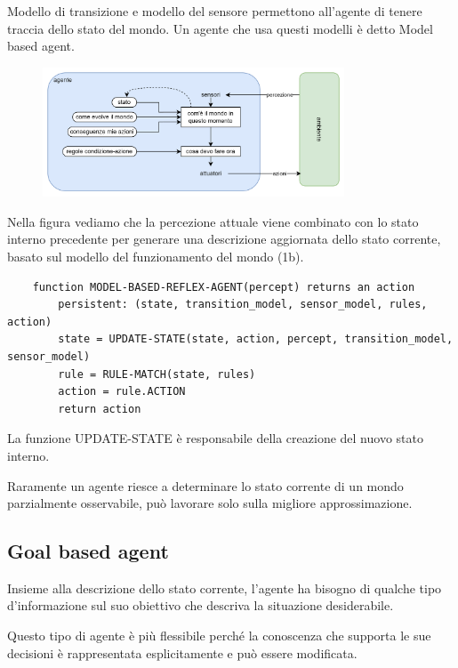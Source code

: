 Modello di transizione e modello del sensore permettono all'agente di tenere traccia dello stato del mondo. Un agente che usa questi modelli è detto \foreignlanguage{english}{Model based agent}.

\begin{figure}[H]
	\centering
	\includegraphics[width=0.8\textwidth]{capitoli/agenti-intelligenti/imgs/model-based.png}
\end{figure}

Nella figura vediamo che la percezione attuale viene combinato con lo stato interno precedente per generare una descrizione aggiornata dello stato corrente, basato sul modello del funzionamento del mondo (1b).

\begin{lstlisting}
	function MODEL-BASED-REFLEX-AGENT(percept) returns an action
		persistent: (state, transition_model, sensor_model, rules, action)
		state = UPDATE-STATE(state, action, percept, transition_model, sensor_model)
		rule = RULE-MATCH(state, rules)
		action = rule.ACTION
		return action
\end{lstlisting}

La funzione UPDATE-STATE è responsabile della creazione del nuovo stato interno.

Raramente un agente riesce a determinare lo stato corrente di un mondo parzialmente osservabile, può lavorare solo sulla migliore approssimazione.

\subsection{\foreignlanguage{english}{Goal based agent}}

Insieme alla descrizione dello stato corrente, l'agente ha bisogno di qualche tipo d'informazione sul suo obiettivo che descriva la situazione desiderabile.

Questo tipo di agente è più flessibile perché la conoscenza che supporta le sue decisioni è rappresentata esplicitamente e può essere modificata.

